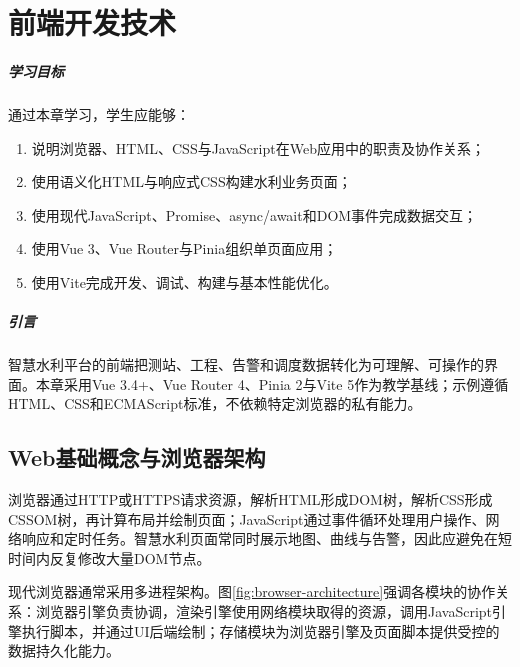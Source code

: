 \chapter{前端开发技术}

\paragraph*{学习目标}

通过本章学习，学生应能够：
\begin{enumerate}
\item 说明浏览器、HTML、CSS与JavaScript在Web应用中的职责及协作关系；
\item 使用语义化HTML与响应式CSS构建水利业务页面；
\item 使用现代JavaScript、Promise、async/await和DOM事件完成数据交互；
\item 使用Vue 3、Vue Router与Pinia组织单页面应用；
\item 使用Vite完成开发、调试、构建与基本性能优化。
\end{enumerate}

\paragraph*{引言}

智慧水利平台的前端把测站、工程、告警和调度数据转化为可理解、可操作的界面。本章采用Vue 3.4+、Vue Router 4、Pinia 2与Vite 5作为教学基线；示例遵循HTML、CSS和ECMAScript标准，不依赖特定浏览器的私有能力。


\section{Web基础概念与浏览器架构}

浏览器通过HTTP或HTTPS请求资源，解析HTML形成DOM树，解析CSS形成CSSOM树，再计算布局并绘制页面；JavaScript通过事件循环处理用户操作、网络响应和定时任务。智慧水利页面常同时展示地图、曲线与告警，因此应避免在短时间内反复修改大量DOM节点。

现代浏览器通常采用多进程架构。图\ref{fig:browser-architecture}强调各模块的协作关系：浏览器引擎负责协调，渲染引擎使用网络模块取得的资源，调用JavaScript引擎执行脚本，并通过UI后端绘制；存储模块为浏览器引擎及页面脚本提供受控的数据持久化能力。

